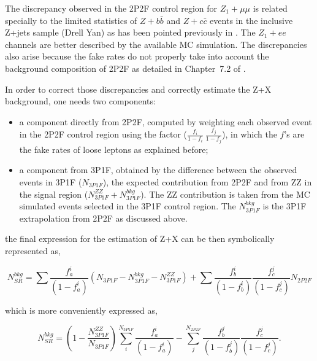 The discrepancy observed in the 2P2F control region for $Z_{1}+\mu\mu$ is related specially to the limited statistics of $Z+b\bar{b}$ and $Z+c\bar{c}$ events in the inclusive Z+jets sample (Drell Yan) as has been pointed previously in \cite{bib:CMS-AN-12-367,bib:CMS-AN-13-108}. The $Z_{1}+ee$ channels are better described by the available MC simulation. The discrepancies also arise because the fake rates do not properly take into account the background composition of 2P2F as detailed in Chapter~7.2 of \cite{bib:CMS-AN-16-442}.

In order to correct those discrepancies and correctly estimate the Z+X background, one needs two components:

\begin{itemize}
	\item a component directly from 2P2F, computed by weighting each observed event in the 2P2F control region using the factor ($\frac{f_{i}}{1-f_{i}}~\frac{f_{j}}{1-f_{j}}$), in which the $f$'s are the fake rates of loose leptons as explained before;
	\item a component from 3P1F, obtained by the difference between the observed events in 3P1F ($N_{3P1F}$), the expected contribution from 2P2F and from ZZ in the signal region ($N^{ZZ}_{3P1F}+N^{bkg}_{3P1F}$). The ZZ contribution is taken from the MC simulated events selected in the 3P1F control region. The $N^{bkg}_{3P1F}$ is the 3P1F extrapolation from 2P2F as discussed above.
\end{itemize}

the final expression for the estimation of Z+X can be then symbolically represented as,

\begin{equation}
N^{bkg}_{SR} = \sum \frac{f^{i}_{a}}{(1-f^{i}_{a})}(N_{3P1F}-N^{bkg}_{3P1F}-N^{ZZ}_{3P1F}) + \sum \frac{f^{i}_{b}}{(1-f^{i}_{b})} \frac{f^{j}_{c}}{(1-f^{j}_{c})} N_{2P2F}
\label{eq:zx_formula1}
\end{equation}

which is more conveniently expressed as,

\begin{equation}
N^{bkg}_{SR} = (1 - \frac{N^{ZZ}_{3P1F}}{N_{3P1F}}) \sum^{N_{3P1F}}_{i} \frac{f^{i}_{a}}{(1-f^{i}_{a})} - \sum^{N_{2P2F}}_{j} \frac{f^{j}_{b}}{(1-f^{j}_{b})} \frac{f^{j}_{c}}{(1-f^{j}_{c})}.
\label{eq:zx_formula2}
\end{equation}

